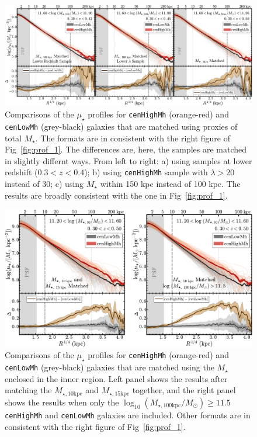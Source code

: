 \documentclass[a4paper,fleqn,usenatbib]{mnras}
\def\rbcg{\texttt{cenHighMh}}
\def\nbcg{\texttt{cenLowMh}}
\def\mstar{{$M_{\star}$}}
\def\minn{{$M_{\star,10\mathrm{kpc}}$}}
\def\meff{{$M_{\star,15\mathrm{kpc}}$}}
\def\logmtot{{$\log_{10} (M_{\star,100\mathrm{kpc}}/M_{\odot})$}}
\def\mden{{$\mu_{\star}$}}
\begin{document}
  \begin{figure}
      \centering 
      \includegraphics[width=\textwidth]{fig/redbcg_prof_3}
      \caption{
        Comparisons of the \mden{} profiles for \rbcg{} (orange-red) and \nbcg{} 
      	(grey-black) galaxies that are matched using proxies of total \mstar{}. 
        The formats are in consistent with the right figure of Fig~\ref{fig:prof_1}.
        The differences are, here, the samples are matched in slightly differnt ways. 
        From left to right: a) using samples at lower redshift ($0.3 < z < 0.4$); 
        b) using \rbcg{} sample with $\lambda > 20$ instead of 30; 
        c) using \mstar{} within 150 kpc instead of 100 kpc.
        The results are broadly consistent with the one in Fig~\ref{fig:prof_1}.
        }
      \label{fig:prof_3} 
  \end{figure}

  \begin{figure}
      \centering 
      \includegraphics[width=15.5cm]{fig/redbcg_prof_4}
      \caption{
          Comparisons of the \mden{} profiles for \rbcg{} (orange-red) and \nbcg{} 
          (grey-black) galaxies that are matched using the \mstar{} enclosed in the 
          inner region. 
          Left panel shows the results after matching the \minn{} and \meff{} together, 
          and the right panel shows the results when only the \logmtot{}$\ge 11.5$
          \rbcg{} and \nbcg{} galaxies are included.
          Other formats are in consistent with the right figure of Fig~\ref{fig:prof_1}.
          }
      \label{fig:prof_4} 
  \end{figure}
\end{document}
